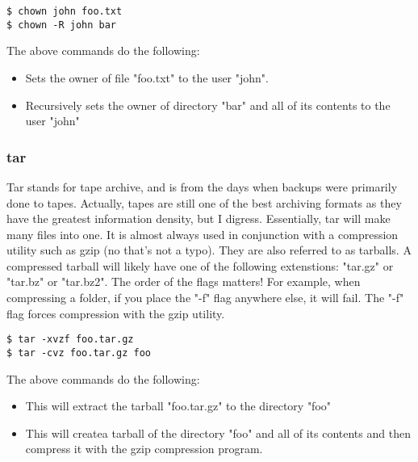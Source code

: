 \begin{lstlisting}
$ chown john foo.txt
$ chown -R john bar
\end{lstlisting}

The above commands do the following:
	\begin{itemize}
		\item Sets the owner of file "foo.txt" to the user "john".
		\item Recursively sets the owner of directory "bar" and all of its contents to the user "john"
	\end{itemize}

\subsubsection{tar} \mdseries
Tar stands for tape archive, and is from the days when backups were primarily done to tapes.  Actually, tapes are still one of the best archiving formats as they have the greatest information density, but I digress.  Essentially, tar will make many files into one.  It is almost always used in conjunction with a compression utility such as gzip (no that's not a typo).  They are also referred to as tarballs.  A compressed tarball will likely have one of the following extenstions: "tar.gz" or "tar.bz" or "tar.bz2".  The order of the flags matters!  For example, when compressing a folder, if you place the "-f" flag anywhere else, it will fail.  The "-f" flag forces compression with the gzip utility.

\begin{lstlisting}
$ tar -xvzf foo.tar.gz
$ tar -cvz foo.tar.gz foo
\end{lstlisting}

The above commands do the following:
	\begin{itemize}
		\item This will extract the tarball "foo.tar.gz" to the directory "foo"
		\item This will createa tarball of the directory "foo" and all of its contents and then compress it with the gzip compression program.
	\end{itemize}

\pagebreak


